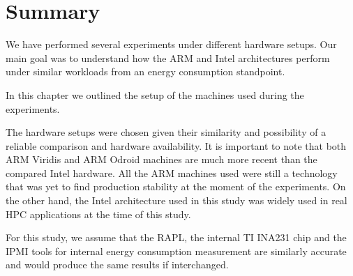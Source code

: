 \clearpage 

\section{Summary}

We have performed several experiments under different hardware setups. 
Our main goal was to understand how the ARM and Intel architectures
perform under similar workloads from an energy consumption standpoint.

In this chapter we outlined the setup of the machines used during the experiments.

The hardware setups were chosen given their similarity and possibility of a reliable comparison and hardware availability. It is important to note that both ARM Viridis and ARM Odroid machines are much more recent than the compared Intel
hardware. All the ARM machines used were still a technology that was yet to find production
stability at the moment of the experiments. On the other hand, the Intel architecture used in this study was widely used in real HPC applications at the time of this study.

For this study, we assume that the RAPL, the internal TI INA231 chip and the IPMI tools for internal energy
consumption measurement are similarly accurate and would produce the same results if interchanged. 

